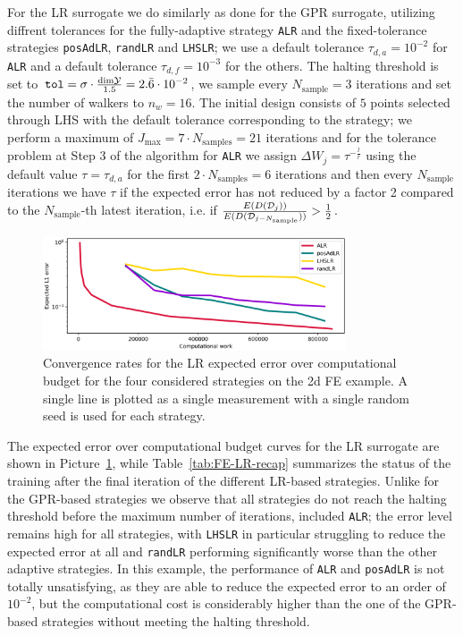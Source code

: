For the LR surrogate we do similarly as done for the GPR surrogate, utilizing diffrent tolerances for the fully-adaptive strategy \texttt{ALR} and the fixed-tolerance strategies \texttt{posAdLR}, \texttt{randLR} and \texttt{LHSLR}; we use a default tolerance $\tau_{d,a}= 10^{-2}$ for \texttt{ALR} and a default tolerance $\tau_{d,f} = 10^{-3}$ for the others.
The halting threshold is set to $\texttt{tol} = \sigma \cdot \frac{\text{dim} \mathcal Y }{1.5} = 2.\bar 6 \cdot 10^{-2}$, we sample every $N_{\text{sample}} = 3$ iterations and set the number of walkers to $n_w = 16$.
The initial design consists of $5$ points selected through LHS with the default tolerance corresponding to the strategy; we perform a maximum of $J_{\max} = 7 \cdot N_{\text{samples}} = 21 $ iterations and for the tolerance problem at Step 3 of the algorithm for \texttt{ALR} we assign $\Delta W_j = \tau ^{-\frac{l}{r}}$ using the default value $\tau= \tau_{d,a}$ for the first $2\cdot N_{\text{samples}} = 6$ iterations and then every $N_{\text{sample}}$ iterations we have $\tau$ if the expected error has not reduced by a factor 2 compared to the $N_{\text{sample}}$-th latest iteration, i.e. if $\frac{E(D(\mathcal D_j))}{E(D(\mathcal D_{j-N_{\text{sample}}}))} > \frac{1}{2}$.\medskip

\begin{figure}[H]
    \begin{center}
        \includegraphics[width=0.8\textwidth]{results/pictures/d2/LR_res.png}
    \end{center}
    \caption{Convergence rates for the LR expected error over computational budget for the four considered strategies on the 2d FE example. A single line is plotted as a single measurement with a single random seed is used for each strategy.}
        \label{fig:FE-LR-convergence}
\end{figure}

The expected error over computational budget curves for the LR surrogate are shown in Picture~\ref{fig:FE-LR-convergence}, while Table~\ref{tab:FE-LR-recap} summarizes the status of the training after the final iteration of the different LR-based strategies. 
Unlike for the GPR-based strategies we observe that all strategies do not reach the halting threshold before the maximum number of iterations, included \texttt{ALR}; the error level remains high for all strategies, with \texttt{LHSLR} in particular struggling to reduce the expected error at all and \texttt{randLR} performing significantly worse than the other adaptive strategies.
In this example, the performance of \texttt{ALR} and \texttt{posAdLR} is not totally unsatisfying, as they are able to reduce the expected error to an order of $10^{-2}$, but the computational cost is considerably higher than the one of the GPR-based strategies without meeting the halting threshold.

